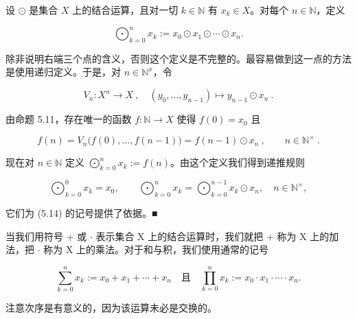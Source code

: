 \begin{example}

设 $ \odot $ 是集合 $ X $ 上的结合运算，且对一切 $ k \in \mathbb{N} $ 有 $ x_k \in X $。对每个 $ n \in \mathbb{N} $，定义

\[
\bigodot_{k=0}^{n}x_{k}:=x_{0}\odot x_{1}\odot\cdots\odot x_{n}.
\]

除非说明右端三个点的含义，否则这个定义是不完整的。最容易做到这一点的方法是使用递归定义。于是，对 $ n \in \mathbb{N}^x $，令

\[
V_{n}\colon X^{n}\to X~,\quad(y_{0},\ldots,y_{n-1})\mapsto y_{n-1}\odot x_{n}~.
\]

由命题 5.11，存在唯一的函数 $ f: \mathbb{N} \to X $ 使得 $ f(0) = x_0 $ 且

\[
f(n)=V_{n}\bigl(f(0),\ldots,f(n-1)\bigr)=f(n-1)\odot x_{n}~,\qquad n\in\mathbb{N}^\times~.
\]

现在对 $ n \in \mathbb{N} $ 定义 $ \bigodot_{k=0}^{n} x_k := f(n) $。由这个定义我们得到递推规则

\[
\bigodot_{k=0}^{0}x_{k}=x_{0},\qquad\bigodot_{k=0}^{n}x_{k}=\bigodot_{k=0}^{n-1}x_{k}\odot x_{n},\quad n\in\mathbb{N}^{\times},
\]

它们为 (5.14) 的记号提供了依据。■

当我们用符号 + 或 $ \cdot $ 表示集合 X 上的结合运算时，我们就把 + 称为 X 上的加法，把 $ \cdot $ 称为 X 上的乘法。对于和与积，我们使用通常的记号

\[
\sum_{k=0}^{n}x_{k}:=x_{0}+x_{1}+\cdots+x_{n}\quad\text{且}\quad\prod_{k=0}^{n}x_{k}:=x_{0}\cdot x_{1}\cdot\cdots\cdot x_{n}.
\]

注意次序是有意义的，因为该运算未必是交换的。

\end{example}

